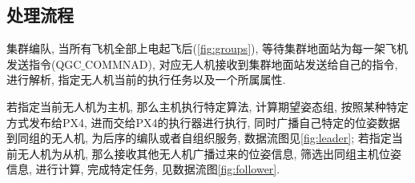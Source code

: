         \subsection{处理流程}
        集群编队, 当所有飞机全部上电起飞后(\ref{fig:groups}), 等待集群地面站为每一架飞机发送指令(QGC$\_$COMMNAD), 对应无人机接收到集群地面站发送给自己的指令, 进行解析, 指定无人机当前的执行任务以及一个所属属性. \par
        若指定当前无人机为主机, 那么主机执行特定算法, 计算期望姿态组, 按照某种特定方式发布给PX4, 进而交给PX4的执行器进行执行, 同时广播自己特定的位姿数据到同组的无人机, 为后序的编队或者自组织服务, 数据流图见\ref{fig:leader}; 
        若指定当前无人机为从机, 那么接收其他无人机广播过来的位姿信息, 筛选出同组主机位姿信息, 进行计算, 完成特定任务, 见数据流图\ref{fig:follower}.
        
